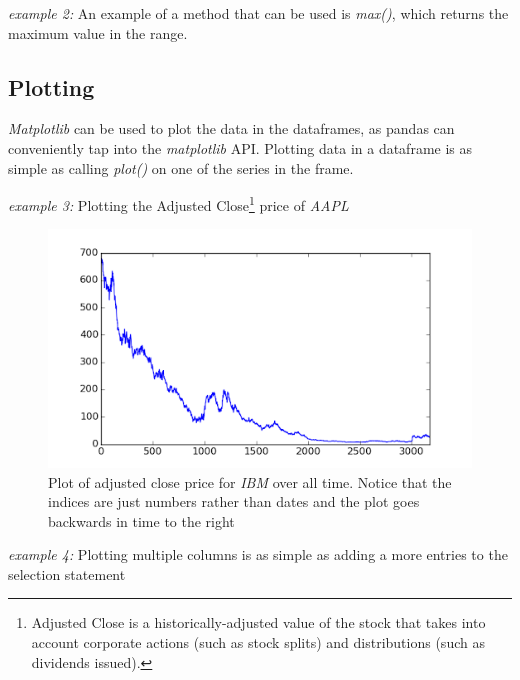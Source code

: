 \noindent
\begin{minipage}{\linewidth}
  \noindent\textit{example 2:} An example of a method that can be
  used is \textit{max()}, which returns the maximum value in the range.\\
  
\end{minipage}

\subsection{Plotting}
\noindent \textit{Matplotlib} can be used to plot the data in the
dataframes, as pandas can conveniently tap into the
\textit{matplotlib} API. Plotting data in a dataframe is as simple as
calling \textit{plot()} on one of the series in the frame.\\

\noindent
\begin{minipage}{\linewidth}
  \noindent\textit{example 3:} Plotting the Adjusted
  Close\footnote{Adjusted Close is a historically-adjusted value of
    the stock that takes into account corporate actions (such as stock
  splits) and distributions (such as dividends issued).} price of \textit{AAPL}
  
\end{minipage}

\begin{figure}
  \centering
  \includegraphics[width=\textwidth]{images/adj_close.png}
  \caption{Plot of adjusted close price for \textit{IBM} over all
    time. Notice that the indices are just numbers rather than dates
  and the plot goes backwards in time to the right}
\end{figure}

\noindent
\begin{minipage}{\linewidth}

  \noindent\textit{example 4:} Plotting multiple columns is as simple
  as adding a more entries to the selection statement

  
\end{minipage}

